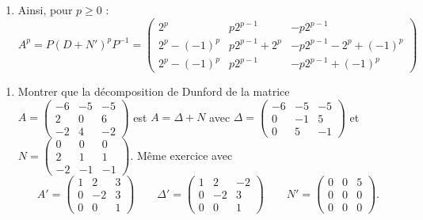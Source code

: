 \documentclass[12pt, class=report,crop=false]{standalone}
\begin{document}
\begin{exemple}
\begin{enumerate}
  \item Ainsi, pour $p\ge0$ :
  $$A^p = P (D+N')^p P^{-1}
  = \begin{pmatrix}
  2^{p} & p2^{p - 1}  & -p2^{p - 1}  \\
2^{p} - (-1)^{p} & p2^{p - 1}  + 2^{p} & -p2^{p - 1} 
- 2^{p} + (-1)^{p} \\
2^{p} - (-1)^{p} & p2^{p - 1}  & -p2^{p - 1} +
(-1)^{p}\end{pmatrix}$$
\end{enumerate}
\end{exemple}


\begin{miniexercices}
\sauteligne
\begin{enumerate}
\item Montrer que la décomposition de Dunford de la matrice
$A = \left(\begin{smallmatrix}
-6 & -5 & -5 \\
2 & 0 & 6 \\
-2 & 4 & -2
  \end{smallmatrix}\right)$
  est $A = \Delta + N$ avec
  $\Delta = \left(\begin{smallmatrix}
-6 & -5 & -5 \\
0 & -1 & 5 \\
0 & 5 & -1
  \end{smallmatrix}\right)$
  et $N = \left(\begin{smallmatrix}
0 & 0 & 0 \\
2 & 1 & 1 \\
-2 & -1 & -1
  \end{smallmatrix}\right)$.
  Même exercice avec
$$A' = \left(\begin{smallmatrix}
1 & 2 & 3 \\
0 & -2 & 3 \\
0 & 0 & 1
  \end{smallmatrix}\right)\qquad
\Delta' =  \left(\begin{smallmatrix}
1 & 2 & -2 \\
0 & -2 & 3 \\
0 & 0 & 1
  \end{smallmatrix}\right) \qquad
N' = \left(\begin{smallmatrix}
0 & 0 & 5 \\
0 & 0 & 0 \\
0 & 0 & 0
  \end{smallmatrix}\right). 
  $$
  

\end{enumerate}
\end{miniexercices}
\end{document}

